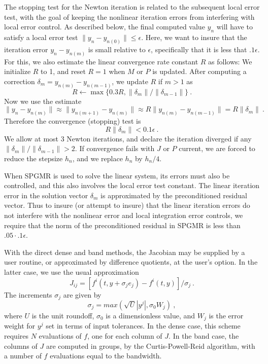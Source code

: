 The stopping test for the Newton iteration is related to the
subsequent local error test, with the goal of keeping the nonlinear
iteration errors from interfering with local error control.  As
described below, the final computed value $y_n$ will have to satisfy a
local error test $\| y_n - y_{n(0)} \| \leq \epsilon$.  Here, we want
to insure that the iteration error $y_n - y_{n(m)}$ is small relative
to $\epsilon$, specifically that it is less that $.1 \epsilon$.
For this, we also estimate the linear convergence rate constant $R$ as
follows: We initialize $R$ to 1, and reset $R = 1$ when $M$ or $P$ is
updated.  After computing a correction $\delta_m = y_{n(m)}-y_{n(m-1)}$,
we update $R$ if $m > 1$ as
\[ R \leftarrow \max\{0.3R , \|\delta_m\| / \|\delta_{m-1}\| \} ~. \]
Now we use the estimate
\[ \| y_n - y_{n(m)} \| \approx \| y_{n(m+1)} - y_{n(m)} \| 
   \approx R \| y_{n(m)} - y_{n(m-1)} \|  =  R \|\delta_m \| ~. \]
Therefore the convergence (stopping) test is 
\[  R \|\delta_m \| < 0.1 \epsilon ~. \]
We allow at most 3 Newton iterations, and declare the iteration
diverged if any $\|\delta_m\| / \|\delta_{m-1}\| > 2$.  If convergence
fails with $J$ or $P$ current, we are forced to reduce the stepsize
$h_n$, and we replace $h_n$ by $h_n/4$.

When SPGMR is used to solve the linear system, its errors must also be
controlled, and this also involves the local error test constant.  The
linear iteration error in the solution vector $\delta_m$ is
approximated by the preconditioned residual vector.  Thus to insure
(or attempt to insure) that the linear iteration errors do not
interfere with the nonlinear error and local integration error
controls, we require that the norm of the preconditioned residual
in SPGMR is less than $.05 \cdot .1 \epsilon$.

With the direct dense and band methods, the Jacobian may be supplied
by a user routine, or approximated by difference quotients,
at the user's option.  In the latter case, we use the usual
approximation
\[ J_{ij} = [f^i(t,y+\sigma_j e_j) - f^i(t,y)]/\sigma_j ~. \]
The increments $\sigma_j$ are given by
\[ \sigma_j = max(\sqrt{U} |y^j| , \sigma_0 W_j) ~, \]
where $U$ is the unit roundoff, $\sigma_0$ is a dimensionless value,
and $W_j$ is the error weight for $y^j$ set in terms of input
tolerances.  In the dense case, this scheme requires $N$ evaluations
of $f$, one for each column of $J$.  In the band case, the columns
of $J$ are computed in groups, by the Curtis-Powell-Reid algorithm,
with a number of $f$ evaluations equal to the bandwidth.

